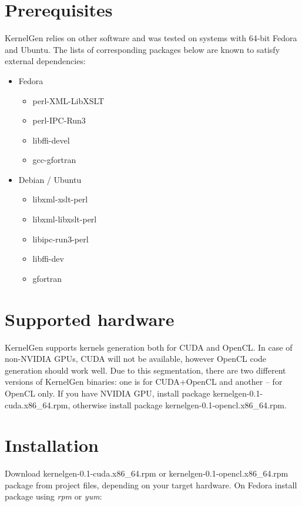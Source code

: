 \documentclass[a4,12pt]{article}
\begin{document}
\section{Prerequisites}

KernelGen relies on other software and was tested on systems with 64-bit Fedora and Ubuntu. The lists of corresponding packages below are known to satisfy external dependencies:

\begin{itemize}
\item Fedora
\begin{itemize}
\item perl-XML-LibXSLT
\item perl-IPC-Run3
\item libffi-devel
\item gcc-gfortran
\end{itemize}
\item Debian / Ubuntu
\begin{itemize}
\item libxml-xslt-perl
\item libxml-libxslt-perl
\item libipc-run3-perl
\item libffi-dev
\item gfortran
\end{itemize}
\end{itemize}

\section{Supported hardware}

KernelGen supports kernels generation both for CUDA and OpenCL. In case of non-NVIDIA GPUs, CUDA will not be available, however OpenCL code generation should work well. Due to this segmentation, there are two different versions of KernelGen binaries: one is for CUDA+OpenCL and another -- for OpenCL only. If you have NVIDIA GPU, install package kernelgen-0.1-cuda.x86\_64.rpm, otherwise install package kernelgen-0.1-opencl.x86\_64.rpm.

\section{Installation}

Download kernelgen-0.1-cuda.x86\_64.rpm or kernelgen-0.1-opencl.x86\_64.rpm package from project files, depending on your target hardware. On Fedora install package using \emph{rpm} or \emph{yum}:
\end{document}
